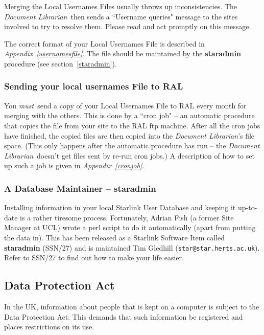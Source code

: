 \documentclass[twoside,11pt]{article}
\newcommand{\xref}[3]{#1}
\begin{document}
Merging the Local Usernames Files usually throws up inconsistencies.
The {\em Document Librarian}\, then sends a ``Username queries" message to the
sites involved to try to resolve them.
Please read and act promptly on this message.

The correct format of your Local Usernames File is described in
{\em Appendix~\ref{usernamesfile}}.
The file should be maintained by the {\bf staradmin} procedure
(see section~\ref{staradmin}).

\subsubsection{\label{SYLUF}Sending your local usernames File to RAL}

You {\em must}\, send a copy of your Local Usernames File to RAL every
month for merging with the others.
This is done by a ``cron job" -- an automatic procedure that copies the file
from your site to the RAL ftp machine.
After all the cron jobs have finished, the copied files are then copied into
the {\em Document Librarian}'s file space.
(This only happens after the automatic procedure has run -- the {\em Document
Librarian}\, doesn't get files sent by re-run cron jobs.)
A description of how to set up such a job is given in
{\em Appendix~\ref{cronjob}}.

\subsubsection{\label{staradmin}A Database Maintainer --  staradmin}

Installing information in your local Starlink User Database and keeping it
up-to-date is a rather tiresome process.
Fortunately, Adrian Fish (a former Site Manager at UCL) wrote a
perl script to do it automatically (apart from putting the data in).
This has been released as a Starlink Software Item called {\bf staradmin}
(SSN/27) and is maintained Tim Gledhill ({\tt star@star.herts.ac.uk}).
Refer to 
\xref{SSN/27}{ssn27}{} to find out how to make your life easier.

\subsection{\label{DPA}Data Protection Act}

In the UK, information about people that is kept on a computer is subject to the
Data Protection Act.
This demands that such information be registered and places restrictions on its
use.
\end{document}
